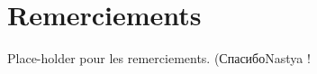 \chapter{Remerciements}
Place-holder pour les remerciements. (\selectfont Спасибо\selectfont  Nastya !
